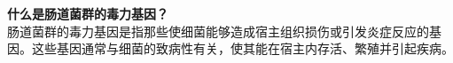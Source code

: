 \documentclass[UTF8]{ctexart}
\begin{document}
\begin{center}
\begin{tcolorbox}[
    enhanced,
    colback=lightpurple!10, %
    colframe=white,  %
    arc=3mm,
    boxrule=0.5pt,
    width=\textwidth,
    top=8pt,
    bottom=8pt
]
{\small{\color{lightpurple}\faQuestionCircle}\quad \textbf{什么是肠道菌群的毒力基因？}\\
{\color{orange!50}\faComments}\quad 肠道菌群的毒力基因是指那些使细菌能够造成宿主组织损伤或引发炎症反应的基因。这些基因通常与细菌的致病性有关，使其能在宿主内存活、繁殖并引起疾病。

}
\end{tcolorbox}

%


\end{center}
\end{document}
